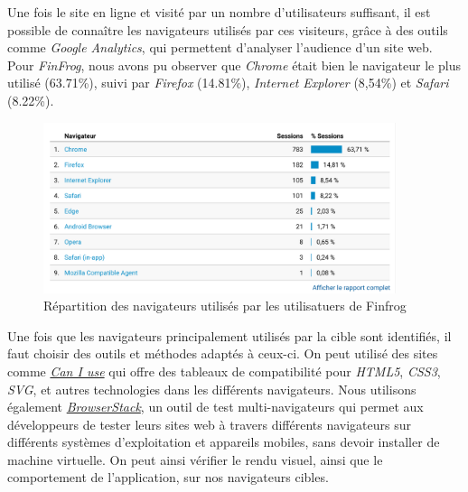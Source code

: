 \bigskip

Une fois le site en ligne et visité par un nombre d'utilisateurs
suffisant, il est possible de connaître les navigateurs utilisés par ces
visiteurs, grâce à des outils comme \emph{Google Analytics}, qui
permettent d'analyser l'audience d'un site web. Pour \emph{FinFrog},
nous avons pu observer que \emph{Chrome} était bien le navigateur le
plus utilisé (63.71\%), suivi par \emph{Firefox} (14.81\%),
\emph{Internet Explorer} (8,54\%) et \emph{Safari} (8.22\%).

\begin{figure}[h]
  \centering
  \includegraphics[height=5cm]{figures/FF-browsers.png}
  \caption{Répartition des navigateurs utilisés par les utilisatuers de Finfrog}
\end{figure}

\bigskip

Une fois que les navigateurs principalement utilisés par la cible sont
identifiés, il faut choisir des outils et méthodes adaptés à ceux-ci. On
peut utilisé des sites comme \href{http://caniuse.com/}{\emph{Can I
use}} qui offre des tableaux de compatibilité pour \emph{HTML5},
\emph{CSS3}, \emph{SVG}, et autres technologies dans les différents
navigateurs. Nous utilisons également
\href{https://www.browserstack.com/}{\emph{BrowserStack}}, un outil de
test multi-navigateurs qui permet aux développeurs de tester leurs sites
web à travers différents navigateurs sur différents systèmes
d'exploitation et appareils mobiles, sans devoir installer de machine
virtuelle. On peut ainsi vérifier le rendu visuel, ainsi que le
comportement de l'application, sur nos navigateurs cibles.

\bigskip

